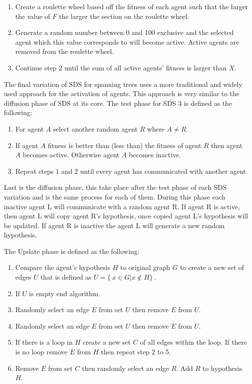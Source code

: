 \documentclass{AISB2008}
\begin{document}
{\begin{enumerate}
\item Create a roulette wheel based off the fitness of each agent such that the larger the value of {$F$} the larger the section on the roulette wheel.
\item Generate a random number between 0 and 100 exclusive and the selected agent which this value corresponds to will become active. Active agents are removed from the roulette wheel.
\item Continue step 2 until the sum of all active agents’ fitness is larger than {$X$}.
\end{enumerate}

The final variation of SDS for spanning trees uses a more traditional and widely used approach for the activation of agents. This approach is very similar to the diffusion phase of SDS at its core.
The test phase for SDS 3 is defined as the following:

\begin{enumerate}
\item For agent {$A$} select another random agent {$R$} where {$A \ne R$}.
\item If agent {$A$} fitness is better than (less than) the fitness of agent {$R$} then agent {$A$} becomes active. Otherwise agent  {$A$} becomes inactive.
\item Repeat steps 1 and 2 until every agent has communicated with another agent.
\end{enumerate}

Last is the diffusion phase, this take place after the test phase of each SDS variation and is the same process for each of them. During this phase each inactive agent L will communicate with a random agent R. If agent R is active, then agent L will copy agent R’s hypothesis, once copied agent L’s hypothesis will be updated. If agent R is inactive the agent L will generate a new random hypothesis. 

The Update phase is defined as the following:

\begin{enumerate}
\item Compare the agent’s hypothesis {$H$} to original graph {$G$} to create a new set of edges {$U$} that is defined as {$U = \{\ x \in G | x \notin H \}\ $}.
\item If {$U$} is empty end algorithm.
\item Randomly select an edge {$E$} from set {$U$} then remove {$E$} from {$U$}. 
\item Randomly select an edge {$E$} from set {$U$} then remove {$E$} from {$U$}. 
\item If there is a loop in {$H$} create a new set {$C$} of all edges within the loop. If there is no loop remove {$E$} from {$H$} then repeat step 2 to 5.
\item Remove {$E$} from set {$C$} then randomly select an edge {$R$}. Add {$R$} to hypothesis {$H$}.
\end{enumerate}

}
\end{document}
